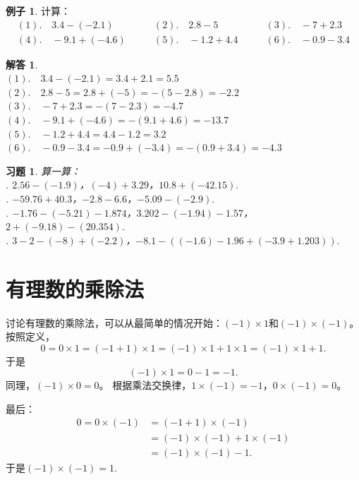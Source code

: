 \documentclass[12pt,UTF8]{ctexbook}
\theoremstyle{definition}
\newtheorem{ex}{例子}[section]
\newtheorem*{so}{解答}
\theoremstyle{plain}
\newtheorem{xt}{习题}[section]
\begin{document}
\begin{ex}
    计算：
    $$
    \begin{array}{lll}
        (1). \quad 3.4 - (-2.1) \quad & \quad (2). \quad 2.8 - 5 \quad & \quad (3). \quad -7 + 2.3 \\
        (4). \quad -9.1 + (-4.6) \quad & \quad (5). \quad -1.2 + 4.4 \quad & \quad (6). \quad -0.9 - 3.4
    \end{array}
    $$
\end{ex}
\begin{so}
    \mbox{}\\
    \indent $(1). \quad 3.4 - (-2.1) = 3.4 + 2.1 = 5.5$ \\
    \indent $(2). \quad 2.8 - 5 = 2.8 + (-5) = -(5 - 2.8) = -2.2$ \\
    \indent $(3). \quad -7 + 2.3 = -(7 - 2.3) = -4.7$ \\
    \indent $(4). \quad -9.1 + (-4.6) = -(9.1 + 4.6) = -13.7$ \\
    \indent $(5). \quad -1.2 + 4.4 = 4.4 - 1.2 = 3.2$ \\
    \indent $(6). \quad -0.9 - 3.4 = -0.9 + (-3.4) = -(0.9 + 3.4) = -4.3 $ 
\end{so}

\begin{xt}\label{xt:3-0-0}
    算一算：\\
    . $2.56 - (-1.9)$，$(-4) + 3.29$，$10.8 + (-42.15).$ \\
    . $-59.76 + 40.3$，$-2.8 - 6.6$，$-5.09 - (-2.9).$ \\
    . $-1.76 -(-5.21) - 1.874$，$3.202 - (-1.94) - 1.57$，$2 + (-9.18) - (20.354).$ \\
    . $3 - 2 - (-8) + (-2.2)$，$-8.1 - ((-1.6) - 1.96 + (-3.9 + 1.203)).$
\end{xt}

\section{有理数的乘除法}
讨论有理数的乘除法，可以从最简单的情况开始：$(-1) \times 1$和$(-1) \times (-1)$。按照定义，
$$0 = 0 \times 1 = (-1 + 1) \times 1 = (- 1) \times 1 + 1 \times 1 = (-1) \times 1 + 1.$$
于是
$$ (-1) \times 1 = 0 - 1 = -1.$$
同理，$(-1) \times 0 = 0$。
根据乘法交换律，$1 \times (-1) = -1$，$0 \times (-1) = 0$。

最后：
\begin{align*}
    0 = 0 \times (-1) &= (- 1 + 1) \times (-1)  \\
    &= (-1) \times (-1) + 1 \times (-1)  \\
    &= (-1) \times (-1) - 1. 
\end{align*}
于是$(-1) \times (-1) = 1.$
\end{document}
